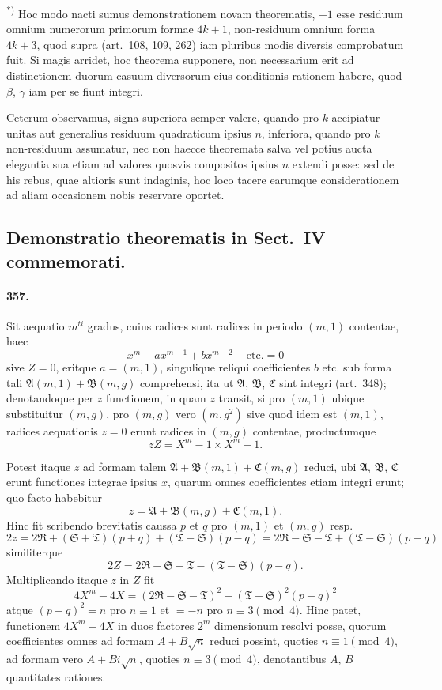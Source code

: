 \documentclass[12pt,a4paper]{article}
\theoremstyle{plain}
\theoremstyle{definition}
\theoremstyle{remark}
\begin{document}
\textsuperscript{*)} Hoc modo nacti sumus demonstrationem novam theorematis, $-1$ esse
residuum omnium numerorum primorum formae $4k+1$, non-residuum omnium
forma $4k+3$, quod supra (art.~108, 109, 262) iam pluribus modis diversis
comprobatum fuit. Si magis arridet, hoc theorema supponere, non necessarium
erit ad distinctionem duorum casuum diversorum eius conditionis rationem
habere, quod $\beta$, $\gamma$ iam per se fiunt integri.

Ceterum observamus, signa superiora semper valere, quando pro $k$ accipiatur
unitas aut generalius residuum quadraticum ipsius $n$, inferiora, quando pro
$k$ non-residuum assumatur, nec non haecce theoremata salva vel potius aucta
elegantia sua etiam ad valores quosvis compositos ipsius $n$ extendi posse:
sed de his rebus, quae altioris sunt indaginis, hoc loco tacere earumque
considerationem ad aliam occasionem nobis reservare oportet.


\subsection*{Demonstratio theorematis in Sect.~IV commemorati.}

\paragraph{357.}
Sit aequatio $m^{ti}$ gradus, cuius radices sunt radices in periodo $(m,1)$
contentae, haec
\[
x^m - ax^{m-1} + bx^{m-2} - \text{etc.} = 0
\]
sive $Z = 0$, eritque $a = (m,1)$, singulique reliqui coefficientes $b$ etc.
sub forma tali $\mathfrak{A}(m,1) + \mathfrak{B}(m,g)$ comprehensi, ita ut
$\mathfrak{A}$, $\mathfrak{B}$, $\mathfrak{C}$ sint integri (art.~348);
denotandoque per $z$ functionem, in quam $z$ transit, si pro $(m,1)$ ubique
substituitur $(m,g)$, pro $(m,g)$ vero $(m,g^2)$ sive quod idem est $(m,1)$,
radices aequationis $z = 0$ erunt radices in $(m,g)$ contentae, productumque
\[
zZ = X^m - 1 \times X^m - 1.
\]

Potest itaque $z$ ad formam talem $\mathfrak{A} + \mathfrak{B}(m,1) + \mathfrak{C}(m,g)$
reduci, ubi $\mathfrak{A}$, $\mathfrak{B}$, $\mathfrak{C}$ erunt functiones integrae
ipsius $x$, quarum omnes coefficientes etiam integri erunt; quo facto habebitur
\[
z = \mathfrak{A} + \mathfrak{B}(m,g) + \mathfrak{C}(m,1).
\]
Hinc fit scribendo brevitatis caussa $p$ et $q$ pro $(m,1)$ et $(m,g)$ resp.
\[
2z = 2\mathfrak{R} + (\mathfrak{S} + \mathfrak{T})(p+q) + (\mathfrak{T} - \mathfrak{S})(p-q)
= 2\mathfrak{R} - \mathfrak{S} - \mathfrak{T} + (\mathfrak{T} - \mathfrak{S})(p-q)
\]
similiterque
\[
2Z = 2\mathfrak{R} - \mathfrak{S} - \mathfrak{T} - (\mathfrak{T} - \mathfrak{S})(p-q).
\]
Multiplicando itaque $z$ in $Z$ fit
\[
4X^m - 4X = (2\mathfrak{R} - \mathfrak{S} - \mathfrak{T})^2 - (\mathfrak{T} - \mathfrak{S})^2 (p-q)^2
\]
atque $(p-q)^2 = n$ pro $n \equiv 1$ et $= -n$ pro $n \equiv 3 \pmod{4}$.
Hinc patet, functionem $4X^m - 4X$ in duos factores $2^m$ dimensionum
resolvi posse, quorum coefficientes omnes ad formam $A + B\sqrt{n}$ reduci
possint, quoties $n \equiv 1 \pmod{4}$, ad formam vero $A + Bi\sqrt{n}$,
quoties $n \equiv 3 \pmod{4}$, denotantibus $A$, $B$ quantitates rationes.
\end{document}

